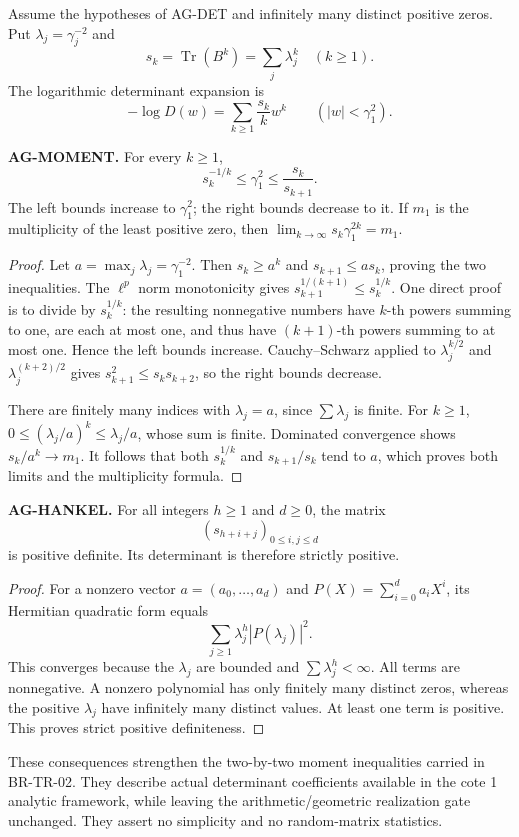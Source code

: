 Assume the hypotheses of AG-DET and infinitely many distinct positive
zeros. Put $\lambda_j=\gamma_j^{-2}$ and
\[
 s_k=\operatorname{Tr}(B^k)=\sum_j\lambda_j^k\quad(k\ge1).
\]
The logarithmic determinant expansion is
\[
 -\log D(w)=\sum_{k\ge1}\frac{s_k}{k}w^k
 \qquad (|w|<\gamma_1^2).
\]

\textbf{AG-MOMENT.} For every $k\ge1$,
\[
 s_k^{-1/k}\le\gamma_1^2\le\frac{s_k}{s_{k+1}}.
\]
The left bounds increase to $\gamma_1^2$; the right bounds decrease to it.
If $m_1$ is the multiplicity of the least positive zero, then
$\lim_{k\to\infty}s_k\gamma_1^{2k}=m_1$.

\begin{proof}
Let $a=\max_j\lambda_j=\gamma_1^{-2}$. Then
$s_k\ge a^k$ and $s_{k+1}\le a s_k$, proving the two inequalities.
The $\ell^p$ norm monotonicity gives
$s_{k+1}^{1/(k+1)}\le s_k^{1/k}$. One direct proof is to divide by
$s_k^{1/k}$: the resulting nonnegative numbers have $k$-th powers
summing to one, are each at most one, and thus have $(k+1)$-th powers
summing to at most one. Hence the left bounds increase.
Cauchy--Schwarz applied to
$\lambda_j^{k/2}$ and $\lambda_j^{(k+2)/2}$ gives
$s_{k+1}^2\le s_ks_{k+2}$, so the right bounds decrease.

There are finitely many indices with $\lambda_j=a$, since $\sum\lambda_j$
is finite. For $k\ge1$,
$0\le(\lambda_j/a)^k\le\lambda_j/a$, whose sum is finite.
Dominated convergence shows
$s_k/a^k\to m_1$. It follows that both $s_k^{1/k}$ and
$s_{k+1}/s_k$ tend to $a$, which proves both limits and the
multiplicity formula.
\end{proof}

\textbf{AG-HANKEL.} For all integers $h\ge1$ and $d\ge0$, the matrix
\[
 (s_{h+i+j})_{0\le i,j\le d}
\]
is positive definite. Its determinant is therefore strictly positive.

\begin{proof}
For a nonzero vector $a=(a_0,\ldots,a_d)$ and
$P(X)=\sum_{i=0}^d a_iX^i$, its Hermitian quadratic form equals
\[
 \sum_{j\ge1}\lambda_j^h|P(\lambda_j)|^2.
\]
This converges because the $\lambda_j$ are bounded and
$\sum\lambda_j^h<\infty$. All terms are nonnegative. A nonzero
polynomial has only finitely many distinct zeros, whereas the positive
$\lambda_j$ have infinitely many distinct values. At least one term
is positive. This proves strict positive definiteness.
\end{proof}

These consequences strengthen the two-by-two moment inequalities carried
in BR-TR-02. They describe actual determinant coefficients available in
the cote 1 analytic framework, while leaving the arithmetic/geometric
realization gate unchanged. They assert no simplicity and no
random-matrix statistics.

